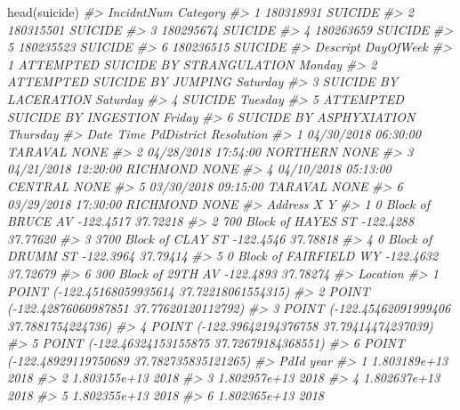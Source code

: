 \documentclass[
]{krantz}
\makeatletter
\newenvironment{Shaded}{\begin{snugshade}}{\end{snugshade}}
\newcommand{\CommentTok}[1]{\textcolor[rgb]{0.37,0.37,0.37}{\textit{#1}}}
\newcommand{\FunctionTok}[1]{\textcolor[rgb]{0,0,0}{#1}}
\newcommand{\NormalTok}[1]{#1}
\newenvironment{kframe}{%
\medskip{}
\setlength{\fboxsep}{.8em}
 \def\at@end@of@kframe{}%
 \ifinner\ifhmode%
  \def\at@end@of@kframe{\end{minipage}}%
  \begin{minipage}{\columnwidth}%
 \fi\fi%
 \def\FrameCommand##1{\hskip\@totalleftmargin \hskip-\fboxsep
 \colorbox{shadecolor}{##1}\hskip-\fboxsep
     \hskip-\linewidth \hskip-\@totalleftmargin \hskip\columnwidth}%
 \MakeFramed {\advance\hsize-\width
   \@totalleftmargin\z@ \linewidth\hsize
   \@setminipage}}%
 {\par\unskip\endMakeFramed%
 \at@end@of@kframe}
\renewenvironment{Shaded}{\begin{kframe}}{\end{kframe}}
\makeatother
\begin{document}
\begin{Shaded}
\begin{Highlighting}[]
\FunctionTok{head}\NormalTok{(suicide)}
\CommentTok{\#\textgreater{}   IncidntNum Category}
\CommentTok{\#\textgreater{} 1  180318931  SUICIDE}
\CommentTok{\#\textgreater{} 2  180315501  SUICIDE}
\CommentTok{\#\textgreater{} 3  180295674  SUICIDE}
\CommentTok{\#\textgreater{} 4  180263659  SUICIDE}
\CommentTok{\#\textgreater{} 5  180235523  SUICIDE}
\CommentTok{\#\textgreater{} 6  180236515  SUICIDE}
\CommentTok{\#\textgreater{}                             Descript DayOfWeek}
\CommentTok{\#\textgreater{} 1 ATTEMPTED SUICIDE BY STRANGULATION    Monday}
\CommentTok{\#\textgreater{} 2       ATTEMPTED SUICIDE BY JUMPING  Saturday}
\CommentTok{\#\textgreater{} 3              SUICIDE BY LACERATION  Saturday}
\CommentTok{\#\textgreater{} 4                            SUICIDE   Tuesday}
\CommentTok{\#\textgreater{} 5     ATTEMPTED SUICIDE BY INGESTION    Friday}
\CommentTok{\#\textgreater{} 6            SUICIDE BY ASPHYXIATION  Thursday}
\CommentTok{\#\textgreater{}         Date     Time PdDistrict Resolution}
\CommentTok{\#\textgreater{} 1 04/30/2018 06:30:00    TARAVAL       NONE}
\CommentTok{\#\textgreater{} 2 04/28/2018 17:54:00   NORTHERN       NONE}
\CommentTok{\#\textgreater{} 3 04/21/2018 12:20:00   RICHMOND       NONE}
\CommentTok{\#\textgreater{} 4 04/10/2018 05:13:00    CENTRAL       NONE}
\CommentTok{\#\textgreater{} 5 03/30/2018 09:15:00    TARAVAL       NONE}
\CommentTok{\#\textgreater{} 6 03/29/2018 17:30:00   RICHMOND       NONE}
\CommentTok{\#\textgreater{}                   Address         X        Y}
\CommentTok{\#\textgreater{} 1     0 Block of BRUCE AV {-}122.4517 37.72218}
\CommentTok{\#\textgreater{} 2   700 Block of HAYES ST {-}122.4288 37.77620}
\CommentTok{\#\textgreater{} 3   3700 Block of CLAY ST {-}122.4546 37.78818}
\CommentTok{\#\textgreater{} 4     0 Block of DRUMM ST {-}122.3964 37.79414}
\CommentTok{\#\textgreater{} 5 0 Block of FAIRFIELD WY {-}122.4632 37.72679}
\CommentTok{\#\textgreater{} 6    300 Block of 29TH AV {-}122.4893 37.78274}
\CommentTok{\#\textgreater{}                                         Location}
\CommentTok{\#\textgreater{} 1  POINT ({-}122.45168059935614 37.72218061554315)}
\CommentTok{\#\textgreater{} 2  POINT ({-}122.42876060987851 37.77620120112792)}
\CommentTok{\#\textgreater{} 3   POINT ({-}122.45462091999406 37.7881754224736)}
\CommentTok{\#\textgreater{} 4  POINT ({-}122.39642194376758 37.79414474237039)}
\CommentTok{\#\textgreater{} 5  POINT ({-}122.46324153155875 37.72679184368551)}
\CommentTok{\#\textgreater{} 6 POINT ({-}122.48929119750689 37.782735835121265)}
\CommentTok{\#\textgreater{}           PdId year}
\CommentTok{\#\textgreater{} 1 1.803189e+13 2018}
\CommentTok{\#\textgreater{} 2 1.803155e+13 2018}
\CommentTok{\#\textgreater{} 3 1.802957e+13 2018}
\CommentTok{\#\textgreater{} 4 1.802637e+13 2018}
\CommentTok{\#\textgreater{} 5 1.802355e+13 2018}
\CommentTok{\#\textgreater{} 6 1.802365e+13 2018}
\end{Highlighting}
\end{Shaded}
\end{document}
